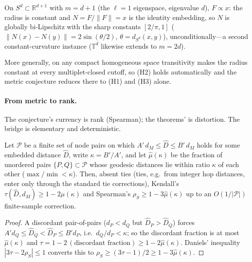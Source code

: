 \documentclass[review]{siamart220329}
\begin{document}
\begin{corollary}\label{cor:sphere}
On $S^d\subset\mathbb{R}^{d+1}$ with $m=d+1$ (the $\ell{=}1$ eigenspace, eigenvalue
$d$), $F\propto x$: the radius is constant and $N=F/\lVert F\rVert=x$ is the
identity embedding, so $N$ is globally bi-Lipschitz with the sharp constants
$[2/\pi,1]$ ($\lVert N(x)-N(y)\rVert=2\sin(\theta/2)$, $\theta=d_{S^d}(x,y)$),
unconditionally---a second constant-curvature instance ($\mathbb{T}^d$ likewise
extends to $m=2d$).
\end{corollary}

\noindent More generally, on any compact homogeneous space transitivity makes the
radius constant at every multiplet-closed cutoff, so (H2) holds automatically and
the metric conjecture reduces there to (H1) and (H3) alone.

\paragraph{From metric to rank.} The conjecture's currency is rank
(Spearman); the theorems' is distortion. The bridge is elementary and
deterministic.

\begin{proposition}\label{prop:rank}
Let $\mathcal P$ be a finite set of node pairs on which
$A'\,d_M\le\widehat D\le B'\,d_M$ holds for some embedded distance
$\widehat D$, write $\kappa=B'/A'$, and let $\hat\mu(\kappa)$ be the fraction
of unordered pairs $\{P,Q\}\subset\mathcal P$ whose geodesic distances lie
within ratio $\kappa$ of each other ($\max/\min<\kappa$). Then, absent ties
(ties, e.g.\ from integer hop distances, enter only through the standard tie
corrections), Kendall's $\tau(\widehat D,d_M)\ge1-2\hat\mu(\kappa)$ and
Spearman's $\rho_S\ge1-3\hat\mu(\kappa)$ up to an $O(1/|\mathcal P|)$
finite-sample correction.
\end{proposition}
\begin{proof}
A discordant pair-of-pairs ($d_P<d_Q$ but $\widehat D_P>\widehat D_Q$)
forces $A'd_Q\le\widehat D_Q<\widehat D_P\le B'd_P$, i.e.\ $d_Q/d_P<\kappa$;
so the discordant fraction is at most $\hat\mu(\kappa)$ and
$\tau=1-2\,(\text{discordant fraction})\ge1-2\hat\mu(\kappa)$. Daniels'
inequality $|3\tau-2\rho_S|\le1$ \cite{daniels1950} converts this to
$\rho_S\ge(3\tau-1)/2\ge1-3\hat\mu(\kappa)$.
\end{proof}
\end{document}
